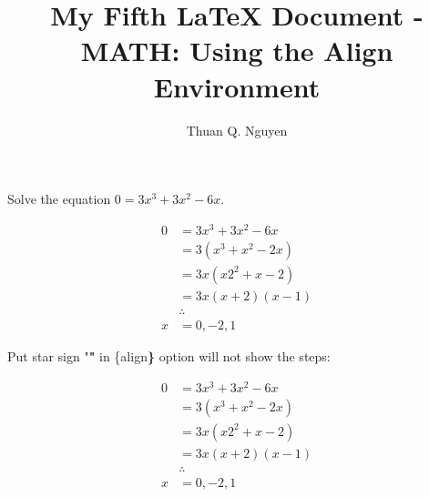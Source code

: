 \documentclass{article}
\begin{document}
\title{My Fifth \LaTeX{} Document - MATH: Using the Align Environment}
\author{Thuan Q. Nguyen}
\maketitle


Solve the equation $0 = 3x^3+3x^2-6x$.

\begin{align}
	0 &= 3x^3+3x^2-6x \\
	&= 3(x^3 +x^2-2x) \\
	&= 3x(x2^2+x-2) \\
	&= 3x(x+2) (x-1) \\
	& \therefore \\
	x &= 0, -2, 1
\end{align}

Put star sign "\textbf*" in \{align\textbf*\} option will not show the steps:

\begin{align*}
	0 &= 3x^3+3x^2-6x \\
	&= 3(x^3 +x^2-2x) \\
	&= 3x(x2^2+x-2) \\
	&= 3x(x+2) (x-1) \\
	& \therefore \\
	x &= 0, -2, 1
\end{align*}
\end{document}
